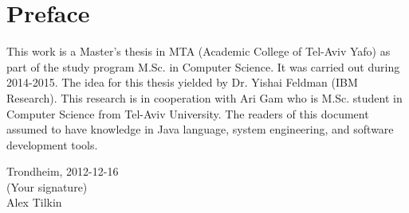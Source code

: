 \section*{Preface}
This work is a Master's thesis in MTA (Academic College of Tel-Aviv Yafo) as part of the study program M.Sc. in Computer Science. It was carried out during 2014-2015. The idea for this thesis yielded by Dr. Yishai Feldman (IBM Research). This research is in cooperation with Ari Gam who is M.Sc. student in Computer Science from Tel-Aviv University. The readers of this document assumed to have knowledge in Java language, system engineering, and software development tools.\\[2cm]

\begin{center}
Trondheim, 2012-12-16\\[1pc]
(Your signature)\\[1pc]
Alex Tilkin
\end{center}